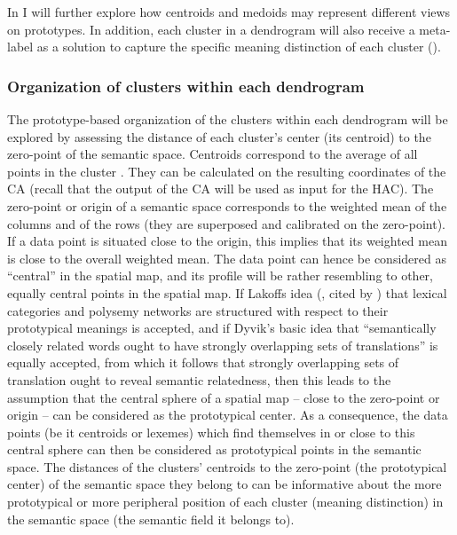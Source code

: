 In  I will further explore how centroids and medoids may represent different views on prototypes. In addition, each cluster in a dendrogram will also receive a meta-label as a solution to capture the specific meaning distinction of each cluster ().

\subsubsection{Organization of clusters within each dendrogram}
\label{sec:3.8.1.1}  
The prototype-based organization of the clusters within each dendrogram will be explored by assessing the distance of each cluster’s center (its centroid) to the zero-point of the semantic space. Centroids correspond to the average of all points in the cluster \citep[494]{tan_introduction_2006}. They can be calculated on the resulting coordinates of the CA (recall that the output of the CA will be used as input for the HAC). The zero-point or origin of a semantic space corresponds to the weighted mean of the columns and of the rows (they are superposed and calibrated on the zero-point). If a data point is situated close to the origin, this implies that its weighted mean is close to the overall weighted mean. The data point can hence be considered as ``central'' in the spatial map, and its profile will be rather resembling to other, equally central points in the spatial map. If Lakoffs idea (\citeyear{lakoff_women_1987}, cited by \citealt{tyler_semantics_2003}) that lexical categories and polysemy networks are structured with respect to their prototypical meanings is accepted, and if Dyvik’s basic idea that “semantically closely related words ought to have strongly overlapping sets of translations” is equally accepted, from which it follows that strongly overlapping sets of translation ought to reveal semantic relatedness, then this leads to the assumption that the central sphere of a spatial map – close to the zero-point or origin – can be considered as the prototypical center. As a consequence, the data points (be it centroids or lexemes) which find themselves in or close to this central sphere can then be considered as prototypical points in the semantic space. The distances of the clusters’ centroids to the zero-point (the prototypical center) of the semantic space they belong to can be informative about the more prototypical or more peripheral position of each cluster (meaning distinction) in the semantic space (the semantic field it belongs to).

